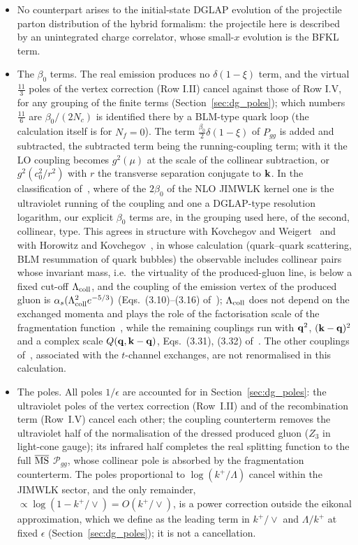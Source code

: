 \begin{itemize}
\item No counterpart arises to the initial-state DGLAP evolution of the projectile parton distribution of the hybrid formalism: the projectile here is described by an unintegrated charge correlator, whose small-$x$ evolution is the BFKL term.
\item The $\beta_0$ terms. The real emission produces no $\delta(1-\xi)$ term, and the virtual $\frac{11}{3}$ poles of the vertex correction (Row I.II) cancel against those of Row I.V, for any grouping of the finite terms (Section~\ref{sec:dg_poles}); which numbers $\frac{11}{6}$ are $\beta_0/(2N_c)$ is identified there by a BLM-type quark loop (the calculation itself is for $N_f=0$). The term $\frac{\beta_0}{2}\delta(1-\xi)$ of $P_{gg}$ is added and subtracted, the subtracted term being the running-coupling term; with it the LO coupling becomes $g^2(\mu)$ at the scale of the collinear subtraction, or $g^2(c_0^2/r^2)$ with $r$ the transverse separation conjugate to $\mathbf{k}$. In the classification of~\cite{Kovner:2023vsy}, where of the $2\beta_0$ of the NLO JIMWLK kernel one is the ultraviolet running of the coupling and one a DGLAP-type resolution logarithm, our explicit $\beta_0$ terms are, in the grouping used here, of the second, collinear, type. This agrees in structure with Kovchegov and Weigert~\cite{Kovchegov:2007vf} and with Horowitz and Kovchegov~\cite{Horowitz:2010yg}, in whose calculation (quark--quark scattering, BLM resummation of quark bubbles) the observable includes collinear pairs whose invariant mass, i.e.\ the virtuality of the produced-gluon line, is below a fixed cut-off $\Lambda_{\rm coll}$, and the coupling of the emission vertex of the produced gluon is $\alpha_s(\Lambda^2_{\rm coll}e^{-5/3})$ (Eqs.~(3.10)--(3.16) of~\cite{Horowitz:2010yg}); $\Lambda_{\rm coll}$ does not depend on the exchanged momenta and plays the role of the factorisation scale of the fragmentation function~\cite{Kovchegov:2007vf}, while the remaining couplings run with $\mathbf{q}^2$, $(\mathbf{k}-\mathbf{q})^2$ and a complex scale $Q(\mathbf{q},\mathbf{k}-\mathbf{q})$, Eqs.~(3.31), (3.32) of~\cite{Horowitz:2010yg}. The other couplings of~\cite{Horowitz:2010yg}, associated with the $t$-channel exchanges, are not renormalised in this calculation.
\item The poles. All poles $1/\epsilon$ are accounted for in Section~\ref{sec:dg_poles}: the ultraviolet poles of the vertex correction (Row~I.II) and of the recombination term (Row~I.V) cancel each other; the coupling counterterm removes the ultraviolet half of the normalisation of the dressed produced gluon ($Z_3$ in light-cone gauge); its infrared half completes the real splitting function to the full $\overline{\rm MS}$ $\mathcal P_{gg}$, whose collinear pole is absorbed by the fragmentation counterterm. The poles proportional to $\log(k^+/\Lambda)$ cancel within the JIMWLK sector, and the only remainder, $\propto\log(1-k^+/\vee)=O(k^+/\vee)$, is a power correction outside the eikonal approximation, which we define as the leading term in $k^+/\vee$ and $\Lambda/k^+$ at fixed $\epsilon$ (Section~\ref{sec:dg_poles}); it is not a cancellation.
\end{itemize}

